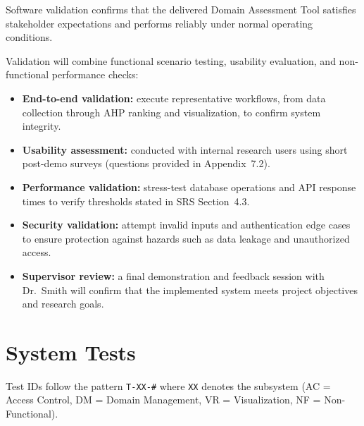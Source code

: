 \documentclass[12pt, titlepage]{article}
\begin{document}



Software validation confirms that the delivered Domain Assessment Tool satisfies
stakeholder expectations and performs reliably under normal operating
conditions.

Validation will combine functional scenario testing, usability evaluation, and
non-functional performance checks:

\begin{itemize}
  \item \textbf{End-to-end validation:} execute representative workflows, from
  data collection through AHP ranking and visualization, to confirm system
  integrity.

  \item \textbf{Usability assessment:} conducted with internal research users
  using short post-demo surveys (questions provided in Appendix~7.2).

  \item \textbf{Performance validation:} stress-test database operations and API
  response times to verify thresholds stated in SRS Section~4.3.

  \item \textbf{Security validation:} attempt invalid inputs and authentication
  edge cases to ensure protection against hazards such as data leakage and
  unauthorized access.

  \item \textbf{Supervisor review:} a final demonstration and feedback session
  with Dr.~Smith will confirm that the implemented system meets project
  objectives and research goals.
\end{itemize}

\section{System Tests}
\label{sec:system-tests}
Test IDs follow the pattern \texttt{T-XX-\#} where \texttt{XX} denotes the
subsystem (AC = Access Control, DM = Domain Management, VR = Visualization,
NF = Non-Functional).
\end{document}
